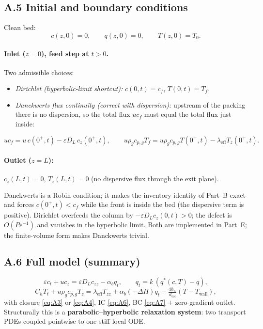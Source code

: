 \documentclass[11pt]{article}
\theoremstyle{remark}
\newcommand{\dcol}{d_{\mathrm{col}}}
\newcommand{\Twall}{T_{\mathrm{wall}}}
\newcommand{\lameff}{\lambda_{\mathrm{eff}}}
\begin{document}
\subsection*{A.5 Initial and boundary conditions}

Clean bed:
\begin{equation}
c(z,0)=0,\qquad q(z,0)=0,\qquad T(z,0)=T_0.
\tag{A.6}\label{eq:A6}
\end{equation}

\paragraph{Inlet ($z=0$), feed step at $t>0$.} Two admissible choices:
\begin{itemize}
\item \emph{Dirichlet (hyperbolic-limit shortcut):} $c(0,t)=c_f$, $T(0,t)=T_f$.
\item \emph{Danckwerts flux continuity (correct with dispersion):} upstream of
the packing there is no dispersion, so the total flux $uc_f$ must equal the
total flux just inside:
\end{itemize}
\begin{equation}
u c_f = u\,c(0^+,t) - \varepsilon D_L\,c_z(0^+,t), \qquad
u\rho_g c_{p,g} T_f = u\rho_g c_{p,g} T(0^+,t) - \lameff T_z(0^+,t).
\tag{A.7}\label{eq:A7}
\end{equation}

\paragraph{Outlet ($z=L$):} $c_z(L,t)=0$, $T_z(L,t)=0$ (no dispersive flux
through the exit plane).

Danckwerts is a Robin condition; it makes the inventory identity of Part~B exact
and forces $c(0^+,t)<c_f$ while the front is inside the bed (the dispersive term
is positive). Dirichlet overfeeds the column by $-\varepsilon D_L c_z(0,t)>0$;
the defect is $O(Pe^{-1})$ and vanishes in the hyperbolic limit. Both are
implemented in Part~E; the finite-volume form makes Danckwerts trivial.

\subsection*{A.6 Full model (summary)}

\begin{equation*}
\varepsilon c_t + u c_z = \varepsilon D_L c_{zz} - \alpha_b q_t, \qquad
q_t = k\,(q^*(c,T)-q),
\end{equation*}
\begin{equation*}
C_h T_t + u\rho_g c_{p,g} T_z = \lameff T_{zz} + \alpha_b(-\Delta H)q_t
- \tfrac{4h_w}{\dcol}(T-\Twall),
\end{equation*}
with closure \eqref{eq:A3} or \eqref{eq:A4}, IC \eqref{eq:A6}, BC \eqref{eq:A7}
$+$ zero-gradient outlet. Structurally this is a
\textbf{parabolic--hyperbolic relaxation system}: two transport PDEs coupled
pointwise to one stiff local ODE.
\end{document}
